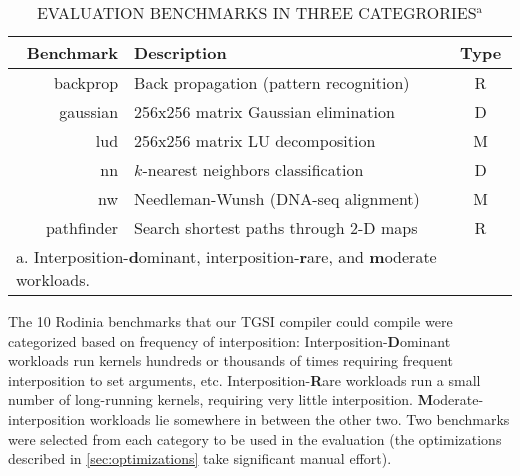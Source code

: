 \newcommand{\RowColor}{\rowcolor{red!50} \cellcolor{white}}
\newcommand{\NewBncColor}{\cellcolor{green!25}}
\newcommand{\FailBncColor}{\cellcolor{gray!50}}

\begin{table}[!ht]
  \centering
  \caption{\small\uppercase{Evaluation Benchmarks in three categrories}$^{\mathrm{a}}$}
  \small
  \begin{tabular}{|r|l|c|}
    \hline
    \textbf{Benchmark} & \textbf{Description} & \textbf{Type} \\ \hline
    backprop & Back propagation (pattern recognition) & R \\ \hline
    gaussian & 256x256 matrix Gaussian elimination & D \\ \hline
    lud & 256x256 matrix LU decomposition & M \\ \hline
    nn & $k$-nearest neighbors classification & D \\ \hline
    nw & Needleman-Wunsh (DNA-seq alignment) & M \\ \hline
    pathfinder & Search shortest paths through 2-D maps & R \\ \hline

    \multicolumn{3}{l}{\footnotesize{$\mathrm{a}.$ Interposition-$\mathbf{d}$ominant, interposition-$\mathbf{r}$are, and $\mathbf{m}$oderate workloads.}}
  \end{tabular}
  \label{tb_bench}
\end{table}

The 10 Rodinia benchmarks that our TGSI compiler could compile were categorized based
on frequency of interposition:
Interposition-\textbf{D}ominant workloads run kernels hundreds or thousands of times requiring
frequent interposition to set arguments, etc.
Interposition-\textbf{R}are workloads run a small number of long-running kernels, requiring very little interposition.
\textbf{M}oderate-interposition workloads lie somewhere in between the other two.
Two benchmarks were selected from each category
to be used in the evaluation
(the optimizations described in \ref{sec:optimizations} take significant manual effort).


